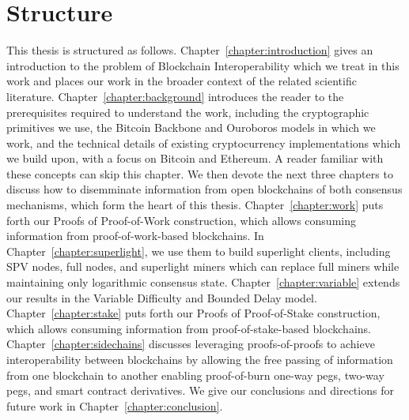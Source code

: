 \section*{Structure}

This thesis is structured as follows. Chapter~\ref{chapter:introduction} gives
an introduction to the problem of Blockchain Interoperability which we treat in
this work and places our work in the broader context of the related scientific
literature. Chapter~\ref{chapter:background} introduces the reader to the
prerequisites required to understand the work, including the cryptographic
primitives we use, the Bitcoin Backbone and Ouroboros models in which we work, and the
technical details of existing cryptocurrency implementations which we build
upon, with a focus on Bitcoin and Ethereum. A reader familiar with
these concepts can skip this chapter. We then devote the next three chapters to
discuss how to disemminate information from open blockchains of both consensus
mechanisms, which form the heart of this thesis. Chapter~\ref{chapter:work} puts forth our Proofs of Proof-of-Work
construction, which allows consuming information from proof-of-work-based
blockchains. In Chapter~\ref{chapter:superlight}, we use them to build
superlight clients, including SPV nodes, full nodes, and superlight miners which
can replace full miners while maintaining only logarithmic consensus state.  Chapter~\ref{chapter:variable} extends our results in the Variable Difficulty and Bounded Delay model. Chapter~\ref{chapter:stake} puts forth our Proofs of
Proof-of-Stake construction, which allows consuming information from
proof-of-stake-based blockchains. Chapter~\ref{chapter:sidechains} discusses
leveraging proofs-of-proofs to achieve interoperability between blockchains by
allowing the free passing of information from one blockchain to another enabling
proof-of-burn one-way pegs, two-way pegs, and smart
contract derivatives. We give our conclusions and directions for future work in
Chapter~\ref{chapter:conclusion}.
